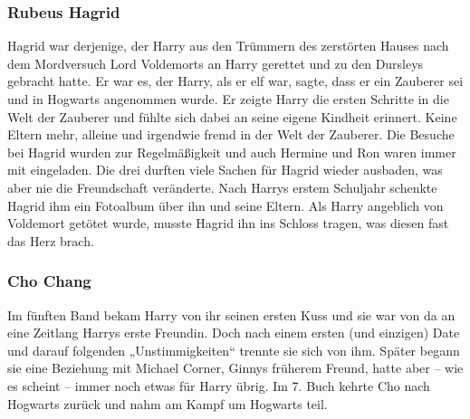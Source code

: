 \documentclass[a4paper, 10pt]{article}
\begin{document}
\subsubsection*{\large Rubeus Hagrid}
Hagrid war derjenige, der Harry aus den Trümmern des zerstörten Hauses nach dem Mordversuch Lord Voldemorts an Harry gerettet und zu den Dursleys gebracht hatte. Er war es, der Harry, als er elf war, sagte, dass er ein Zauberer sei und in Hogwarts angenommen wurde. Er zeigte Harry die ersten Schritte in die Welt der Zauberer und fühlte sich dabei an seine eigene Kindheit erinnert. Keine Eltern mehr, alleine und irgendwie fremd in der Welt der Zauberer.
\vspace{10pt}
\newline
{}  
Die Besuche bei Hagrid wurden zur Regelmäßigkeit und auch Hermine und Ron waren immer mit eingeladen. Die drei durften viele Sachen für Hagrid wieder ausbaden, was aber nie die Freundschaft veränderte.
\vspace{10pt}
\newline
{}  
Nach Harrys erstem Schuljahr schenkte Hagrid ihm ein Fotoalbum über ihn und seine Eltern.
\vspace{10pt}
\newline
{}  
Als Harry angeblich von Voldemort getötet wurde, musste Hagrid ihn ins Schloss tragen, was diesen fast das Herz brach.
\subsubsection*{\large Cho Chang}
Im fünften Band bekam Harry von ihr seinen ersten Kuss und sie war von da an eine Zeitlang Harrys erste Freundin. Doch nach einem ersten (und einzigen) Date und darauf folgenden „Unstimmigkeiten“ trennte sie sich von ihm. Später begann sie eine Beziehung mit Michael Corner, Ginnys früherem Freund, hatte aber – wie es scheint – immer noch etwas für Harry übrig. Im 7. Buch kehrte Cho nach Hogwarts zurück und nahm am Kampf um Hogwarts teil.
\end{document}
